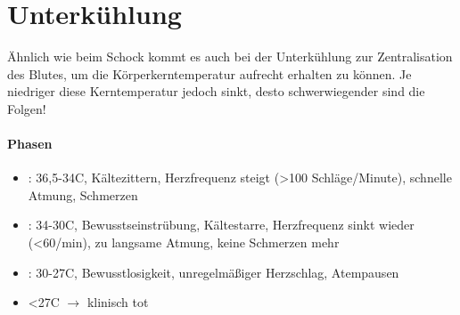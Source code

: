 


\clearpage
\section{Unterkühlung}

Ähnlich wie beim Schock kommt es auch  bei der Unterkühlung zur
Zentralisation  des Blutes, um die  Körperkerntemperatur aufrecht
erhalten  zu können. Je niedriger diese  Kerntemperatur jedoch sinkt,
desto  schwerwiegender sind die Folgen!

\paragraph{Phasen}

\begin{itemize}
\item {\mdseries
{}:  36,5{\textdegree}-34{\textdegree}C,
Kältezittern, Herzfrequenz steigt ({\textgreater}100
Schläge/Minute), schnelle Atmung, Schmerzen}

\item {\mdseries
{}:
34{\textdegree}-30{\textdegree}C, Bewusstseinstrübung, Kältestarre,
Herzfrequenz sinkt wieder ({\textless}60/min), zu langsame Atmung,
keine Schmerzen mehr}

\item {\mdseries
{}: 30{\textdegree}-27{\textdegree}C,
Bewusstlosigkeit, unregelmäßiger Herzschlag, Atempausen}

\item {\mdseries
{\textless}27{\textdegree}C ${\rightarrow}$ klinisch tot}

\end{itemize}


